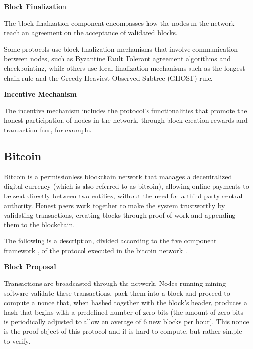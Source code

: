 \vspace{0.25cm}

\textbf{Block Finalization}

The block finalization component encompasses how the nodes in the network reach an agreement on the acceptance of validated blocks.

Some protocols use block finalization mechanisms that involve communication between nodes, such as Byzantine Fault Tolerant agreement algorithms and checkpointing, while others use local finalization mechanisms such as the longest-chain rule and the Greedy Heaviest Observed Subtree (GHOST) rule.

\vspace{0.25cm}

\textbf{Incentive Mechanism}

The incentive mechanism includes the protocol’s functionalities that promote the honest participation of nodes in the network, through block creation rewards and transaction fees, for example.





\subsection{Bitcoin}

Bitcoin \cite{bitcoin} is a permissionless blockchain network that manages a decentralized digital currency (which is also referred to as bitcoin), allowing online payments to be sent directly between two entities, without the need for a third party central authority. Honest peers work together to make the system trustworthy by validating transactions, creating blocks through proof of work and appending them to the blockchain.

The following is a description, divided according to the five component framework \cite{survey_bchain_networks}, of the protocol executed in the bitcoin network \cite{bitcoin} \cite{info_propagation_bitcoin}.


\vspace{0.5cm}

\textbf{Block Proposal}

Transactions are broadcasted through the network. Nodes running mining software validate these transactions, pack them into a block and proceed to compute a nonce that, when hashed together with the block’s header, produces a hash that begins with a predefined number of zero bits (the amount of zero bits is periodically adjusted to allow an average of 6 new blocks per hour). This nonce is the proof object of this protocol and it is hard to compute, but rather simple to verify.

